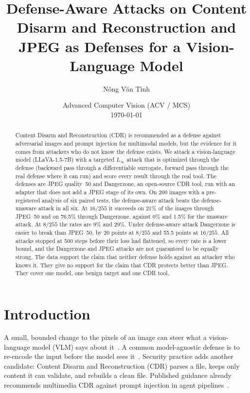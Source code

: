 \documentclass[11pt]{article}
\title{\vspace{-2.2em}\textbf{Defense-Aware Attacks on Content Disarm and Reconstruction
and JPEG as Defenses for a Vision-Language Model}}
\author{Nông Văn Tình}
\date{Advanced Computer Vision (ACV / MCS) \\ \today}
\begin{document}
\maketitle
\vspace{-1.2em}

\begin{abstract}
\noindent
Content Disarm and Reconstruction (CDR) is recommended as a defense against adversarial
images and prompt injection for multimodal models, but the evidence for it comes from
attackers who do not know the defense exists. We attack a vision-language model
(LLaVA-1.5-7B) with a targeted $L_\infty$ attack that is optimized through the defense
(backward pass through a differentiable surrogate, forward pass through the real defense
where it can run) and score every result through the real tool. The defenses are JPEG
quality~50 and Dangerzone, an open-source CDR tool, run with an adapter that does not add
a JPEG stage of its own. On 200 images with a pre-registered analysis of six paired tests,
the defense-aware attack beats the defense-unaware attack in all six. At $16/255$ it
succeeds on 21\% of the images through JPEG~50 and on 76.5\% through Dangerzone, against
0\% and 1.5\% for the unaware attack. At $8/255$ the rates are 9\% and 29\%. Under
defense-aware attack Dangerzone is easier to break than JPEG~50, by 20 points at $8/255$
and 55.5 points at $16/255$. All attacks stopped at 500 steps before their loss had
flattened, so every rate is a lower bound, and the Dangerzone and JPEG attacks are not
guaranteed to be equally strong. The data support the claim that neither defense holds
against an attacker who knows it. They give no support for the claim that CDR protects
better than JPEG. They cover one model, one benign target and one CDR tool.
\end{abstract}

\section{Introduction}

A small, bounded change to the pixels of an image can steer what a vision-language model
(VLM) says about it~\cite{qi2024visualaaai}. A common model-agnostic defense is to
re-encode the input before the model sees it~\cite{guo2018countering}. Security practice
adds another candidate: Content Disarm and Reconstruction (CDR) parses a file, keeps only
content it can validate, and rebuilds a clean file. Published guidance already recommends
multimedia CDR against prompt injection in agent pipelines~\cite{safm49}.
\end{document}
